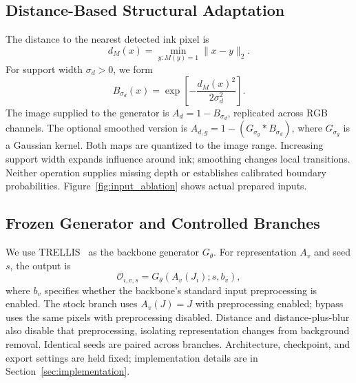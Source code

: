 \subsection{Distance-Based Structural Adaptation}
The distance to the nearest detected ink pixel is
\begin{equation}
 d_M(x)=\min_{y:M(y)=1}\|x-y\|_2.
\end{equation}
For support width $\sigma_d>0$, we form
\begin{equation}
 B_{\sigma_d}(x)=\exp\left[-\frac{d_M(x)^2}{2\sigma_d^2}\right].
\end{equation}
The image supplied to the generator is $A_d=1-B_{\sigma_d}$, replicated across
RGB channels. The optional smoothed version is
$A_{d,g}=1-(G_{\sigma_g}*B_{\sigma_d})$, where $G_{\sigma_g}$ is a Gaussian
kernel. Both maps are quantized to the image range. Increasing support width
expands influence around ink; smoothing changes local transitions. Neither
operation supplies missing depth or establishes calibrated boundary probabilities.
Figure~\ref{fig:input_ablation} shows actual prepared inputs.

\subsection{Frozen Generator and Controlled Branches}
We use TRELLIS~\cite{xiang2025trellis} as the backbone generator $G_\theta$.
For representation $A_v$ and seed $s$, the output is
\begin{equation}
 \mathcal O_{i,v,s}=G_\theta(A_v(J_i);s,b_v),
\end{equation}
where $b_v$ specifies whether the backbone's standard input preprocessing is
enabled. The stock branch uses $A_v(J)=J$ with preprocessing enabled; bypass
uses the same pixels with preprocessing disabled. Distance and distance-plus-blur
also disable that preprocessing, isolating representation changes from
background removal. Identical seeds are paired across branches. Architecture,
checkpoint, and export settings are held fixed; implementation details are in
Section~\ref{sec:implementation}.

